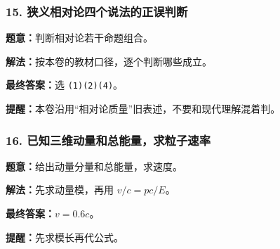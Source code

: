 \documentclass[12pt,a4paper]{ctexart}
\begin{document}
\subsubsection*{15. 狭义相对论四个说法的正误判断}
\begin{tcolorbox}[colback=gray!2!white,colframe=black!60,title={题目}]
\textbf{题意：}判断相对论若干命题组合。\par
\end{tcolorbox}
\begin{tcolorbox}[colback=blue!2!white,colframe=blue!55!black,title={完整答案}]
\textbf{解法：}按本卷的教材口径，逐个判断哪些成立。\par
\textbf{最终答案：}选 \texttt{(1)(2)(4)}。\par

\end{tcolorbox}
\begin{tcolorbox}[colback=red!2!white,colframe=red!55!black,title={易错点}]
\textbf{提醒：}本卷沿用“相对论质量”旧表述，不要和现代理解混着判。\par
\end{tcolorbox}

\subsubsection*{16. 已知三维动量和总能量，求粒子速率}
\begin{tcolorbox}[colback=gray!2!white,colframe=black!60,title={题目}]
\textbf{题意：}给出动量分量和总能量，求速度。\par
\end{tcolorbox}
\begin{tcolorbox}[colback=blue!2!white,colframe=blue!55!black,title={完整答案}]
\textbf{解法：}先求动量模，再用 \(v/c=pc/E\)。\par
\textbf{最终答案：}\(v=0.6c\)。\par

\end{tcolorbox}
\begin{tcolorbox}[colback=red!2!white,colframe=red!55!black,title={易错点}]
\textbf{提醒：}先求模长再代公式。\par
\end{tcolorbox}
\end{document}
